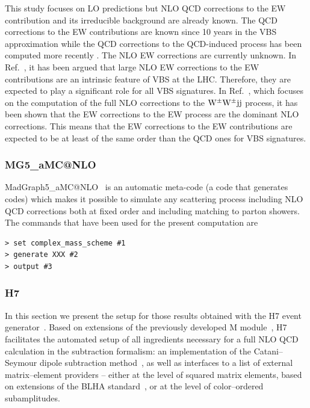 \documentclass[11pt]{cernrep}
\makeatletter
\newcommand{\Herwig}{H\protect\scalebox{0.8}{ERWIG}7\xspace}
\newcommand{\Matchbox}{M\protect\scalebox{0.8}{ATCHBOX}\xspace}
\newcommand{\MGaMC}{M\protect\scalebox{0.8}{AD}G\protect\scalebox{0.8}{RAPH}5\_aMC@NLO\xspace}
\newcommand{\MP}[1]{{ {\color{blue}{ [MP: #1]}} }}
\makeatother
\begin{document}
This study focuses on LO predictions but NLO QCD corrections to the EW contribution and its irreducible background are already known.
The QCD corrections to the EW contributions are known since 10 years in the VBS approximation \cite{Bozzi:2007ur} while the QCD corrections to the QCD-induced process has been computed more recently \cite{Campanario:2013qba}.
The NLO EW corrections are currently unknown.
In Ref.~\cite{Biedermann:2016yds}, it has been argued that large NLO EW corrections to the EW contributions are an intrinsic feature of VBS at the LHC.
Therefore, they are expected to play a significant role for all VBS signatures.
In Ref.~\cite{Biedermann:2017bss}, which focuses on the computation of the full NLO corrections to the ${\rm W}^\pm{\rm W}^\pm{\rm j}{\rm j}$ process, it has been shown that the EW corrections to the EW process are the dominant NLO corrections.
This means that the EW corrections to the EW contributions are expected to be at least of the same order than the QCD ones for VBS signatures.
\MP{Add some comments on parton shower effects that can play a significant role.}

\subsubsection*{\protect\MGaMC \label{vbs_mgamc}}

{\sc MadGraph5\_aMC@NLO}~\cite{Alwall:2014hca} is an automatic meta-code (a code that generates codes) which makes it possible to simulate any scattering process
      including NLO QCD corrections both at fixed order and including matching to parton showers. 
      The commands that have been used for the present computation are
\begin{verbatim}
> set complex_mass_scheme #1
> generate XXX #2
> output #3
\end{verbatim}
  
  
\subsubsection*{\protect\Herwig \label{vbs_herwig}}

In this section we present the setup for those results obtained with
the \Herwig event generator~\cite{Bellm:2015jjp,Bahr:2008pv}.  Based
on extensions of the previously developed \Matchbox
module~\cite{Platzer:2011bc}, \Herwig facilitates the automated setup
of all ingredients necessary for a full NLO QCD calculation in the
subtraction formalism: an implementation of the Catani--Seymour dipole
subtraction method~\cite{Catani:1996vz,Catani:2002hc}, as well as
interfaces to a list of external matrix--element providers -- either
at the level of squared matrix elements, based on extensions of the
BLHA standard~\cite{Binoth:2010xt,Alioli:2013nda,Andersen:2014efa}, or
at the level of color--ordered subamplitudes.
\end{document}
